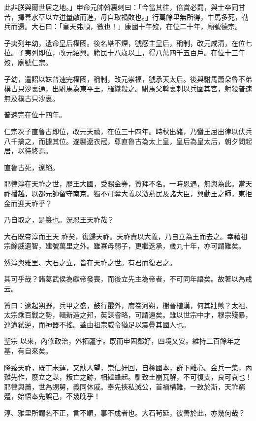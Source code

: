 \begin{pinyinscope}
 此非朕與爾世居之地。」申命元帥斡裏刺曰：「今當其往，倍賞必罰，與士卒同甘苦，擇善水草以立迸量敵而進，毋自取禍敗也。」行萬餘里無所得，牛馬多死，勒兵而還。大石曰：「皇天弗順，數也！」康國十年歿，在位二十年，廟號德宗。



 子夷列年幼，遺命皇后權國。後名塔不煙，號感主皇后，稱制，改元咸清，在位七拉。子夷列即位，改元紹興。籍民十八歲以上，得八萬四千五百戶。在位十三年歿，廟號仁宗。



 子幼，遣詔以妹普速完權國，稱制，改元崇福，號承天太后。後與駙馬蕭朵魯不弟
 樸古只沙裏通，出駙馬為東平王，羅織殺之。駙馬父斡裏刺以兵圍其宮，射殺普速無及樸古只沙裏。



 普速完在位十四年。



 仁宗次子直魯古即位，改元天禧，在位三十四年。時秋出豬，乃蠻王屈出律以伏兵八千擒之，而據其位。遂襲遼衣冠，尊直魯古為太上皇，皇后為皇太后，朝夕問起居，以待終焉。



 直魯古死，遼絕。



 耶律淳在天祚之世，歷王大國，受賜金券，贊拜不名。一時恩遇，無與為此。當天祚播越，以都元帥留守南京。獨不可奪大義以激燕民及諸大臣，興勤王之師，東拒金而迎天祚乎？



 乃自取之，是篡也。況忍王天祚哉？



 大石既帝淳而王天
 祚矣，復歸天祚。天祚責以大義，乃自立為王而去之。幸藉祖宗餘威遺智，建號萬里之外。雖寡母弱子，更繼迭承，歲九十年，亦可謂難矣。



 然淳與雅里、大石之立，皆在天祚之世。有君而復君之。



 其可乎哉？諸葛武侯為獻帝發喪，而後立先主為帝者，不可同年語矣。故著以為戒云。



 贊曰：遼起朔野，兵甲之盛，鼓行霵外，席卷河朔，樹晉植漢，何其壯歟？太祖、太宗乘百戰之勢，輯新造之邦，英謀睿略，可謂遠矣。雖以世宗中才，穆宗殘暴，連遘弒逆，而神器不搖。蓋由祖宗威令猶足以震疊其國人也。



 聖宗
 以來，內修政治，外拓疆宇。既而申固鄰好，四境乂安。維持二百餘年之基，有自來矣。



 降臻天祚，既丁末運，又觖人望，崇信奸回，自椓國本，群下離心。金兵一集，內難先作，廢立之謀，叛亡之跡，相繼蜂起。馴致土崩瓦解，不可復支，良可哀也！耶律與蕭，世為甥舅，義同休戚。奉先挾私滅公，首禍構難，一致於斯，天祚窮蹙，始悟奉先誤己，不幾晚乎！



 淳、雅里所謂名不正，言不順，事不成者也。大石茍延，彼善於此，亦幾何哉？



\end{pinyinscope}